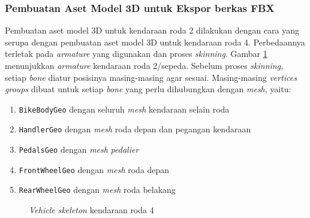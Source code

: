 \subsubsection{Pembuatan Aset Model 3D untuk Ekspor berkas FBX}

Pembuatan aset model 3D untuk kendaraan roda 2 dilakukan dengan cara yang serupa
dengan pembuatan aset model 3D untuk kendaraan roda 4. Perbedaannya terletak
pada \textit{armature} yang digunakan dan proses \textit{skinning}. Gambar
\ref{fig:bike-skeleton} menunjukkan \textit{armature} kendaraan roda 2/sepeda.
Sebelum proses \textit{skinning}, setiap \textit{bone} diatur posisinya
masing-masing agar sesuai. Masing-masing \textit{vertices groups} dibuat untuk
setiap \textit{bone} yang perlu dihubungkan dengan \textit{mesh}, yaitu:

\begin{enumerate}
    \item \verb|BikeBodyGeo| dengan seluruh \textit{mesh} kendaraan selain roda
    \item \verb|HandlerGeo| dengan \textit{mesh} roda depan dan pegangan
    kendaraan
    \item \verb|PedalsGeo| dengan \textit{mesh} \textit{pedalier}
    \item \verb|FrontWheelGeo| dengan \textit{mesh} roda depan
    \item \verb|RearWheelGeo| dengan \textit{mesh} roda belakang
\end{enumerate}

\begin{figure}[!h]
    \centering
    \hfill
    \caption{\textit{Vehicle skeleton} kendaraan roda 4}
    \label{fig:bike-skeleton}
\end{figure}

